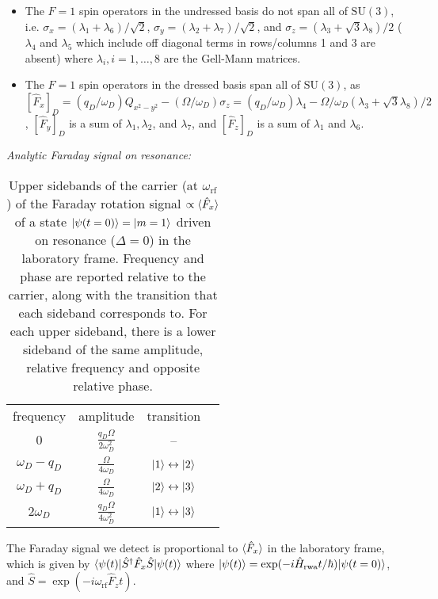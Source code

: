 \documentclass[aps,prl,reprint,superscriptaddress,floatfix]{revtex4-1}
\begin{document}
\begin{itemize}
    \item The $F=1$ spin operators in the undressed basis do not span all of $\text{SU}(3)$, i.e. $\sigma_x = (\lambda_1 + \lambda_6)/\sqrt{2}$, $\sigma_y = (\lambda_2 + \lambda_7)/\sqrt{2}$, and $\sigma_z = (\lambda_3 + \sqrt{3} \lambda_8)/2$ ($\lambda_4$ and $\lambda_5$ which include off diagonal terms in rows/columns 1 and 3 are absent) where $\lambda_i, i = 1,\dots,8$ are the Gell-Mann matrices.
    \item The $F=1$ spin operators in the dressed basis span  all of $\text{SU}(3)$, as $[\hat{F}_x]_D = (q_D/\omega_D) Q_{x^2-y^2} - (\Omega / \omega_D) \sigma_z = (q_D/\omega_D) \lambda_4 - \Omega / \omega_D ( \lambda_3 +\sqrt{3} \lambda_8) / 2$, $[\hat{F}_y]_D$ is a sum of $\lambda_1, \lambda_2$, and $\lambda_7$, and  $[\hat{F}_z]_D$ is a sum of $\lambda_1$ and $\lambda_6$. 
\end{itemize}
\textit{Analytic Faraday signal on resonance:}
\begin{table}[]
\centering
\caption{Upper sidebands of the carrier (at $\omega_{\text{rf}}$) of the Faraday rotation signal $\propto \langle \hat{F}_x \rangle$ of a state $\vert \psi(t=0) \rangle =\vert m=1 \rangle $ driven on resonance ($\Delta = 0$) in the laboratory frame. Frequency and phase are reported relative to the carrier, along with the transition that each sideband corresponds to. For each upper sideband, there is a lower sideband of the same amplitude, relative frequency and opposite \note{$\pi$} relative phase.}
\label{tab:sidebands}
\begin{tabular}{cccc}
frequency & amplitude & transition \\ \hhline{====}
 $0$ & $\frac{q_D \Omega }{2 \omega_D^2}$ & -- \\
 $\omega_D-q_D$ & $\frac{\Omega}{4 \omega_D}$ & $\vert 1 \rangle  \leftrightarrow \vert 2 \rangle $ \\
 $\omega_D+q_D$ & $\frac{\Omega}{4 \omega_D}$ & $\vert 2 \rangle  \leftrightarrow \vert 3 \rangle $\\
 $2 \omega_D$ & $\frac{q_D \Omega}{4 \omega_D^2}$ & $\vert 1 \rangle  \leftrightarrow \vert 3 \rangle $
\end{tabular}
\end{table}
The Faraday signal we detect is proportional to $\langle \hat{F}_x \rangle$ in the laboratory frame, which is given by $\langle \psi(t) \vert \hat{S}^{\dagger} \hat{F}_x \hat{S} \vert \psi(t) \rangle $ where $\vert \psi(t) \rangle  = \exp(-i \hat{H}_{\text{rwa}} t/\hbar) \vert \psi(t=0) \rangle $, and $\hat{S} = \exp(-i \omega_{\text{rf}} \hat{F}_z t)$.
\end{document}
